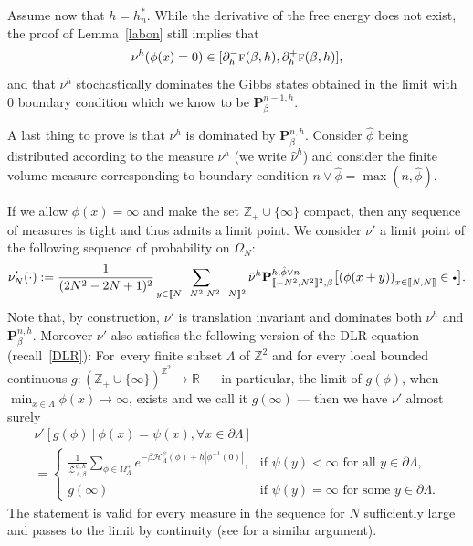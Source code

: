 \documentclass[JEP,XML,SOM,Unicode, NoFloatCountersInSection]{cedram}
\let\mathcal\mathscr
\newcommand{\sbullet}{{\scriptscriptstyle\bullet}}
\newcommand{\csbullet}{{\raisebox{1pt}{$\sbullet$}}}
\numberwithin{equation}{section}
\theoremstyle{plain}
\theoremstyle{definition}
\newcommand{\lint}{\llbracket}
\newcommand{\rint}{\rrbracket}
\newcommand{\cH}{{\ensuremath{\mathcal H}} }
\newcommand{\cZ}{{\ensuremath{\mathcal Z}} }
\newcommand{\bP}{{\ensuremath{\mathbf P}} }
\newcommand{\bbR}{{\ensuremath{\mathbb R}} }
\newcommand{\bbZ}{{\ensuremath{\mathbb Z}} }
\newcommand{\gb}{\beta}
\newcommand{\gO}{\Omega}
\newcommand{\gL}{\Lambda}
\newcommand{\tf}{\textsc{f}}
\begin{document}
Assume now that $h=h^*_n$.
While the derivative of the free energy does not exist, the proof of Lemma~\ref{labon} still implies that
\[
\nu^h(\phi(x)=0)\in [\partial^-_h \tf(\gb,h),\partial^+_h\tf(\gb,h)],
\]
and that $\nu^h$ stochastically
dominates the Gibbs states obtained in the limit with $0$ boundary condition which we know to be $\bP^{n-1,h}_\gb$.

A last thing to prove is that $\nu^h$ is dominated by $\bP^{n,h}_{\gb}$.
Consider $\hat \phi$ being distributed according to the measure $\nu^h$ (we write $\hat \nu^h$)
and consider the finite volume measure corresponding to boundary condition $n\vee\hat \phi=\max(n,\hat \phi)$.

If we allow $\phi(x)=\infty$ and make the set $\bbZ_+\cup\{\infty\}$ compact, then any sequence of measures is tight and thus admits a limit point.
We consider $\nu'$ a limit point of the following sequence of probability on $\gO_N$:
\begin{equation*}
\nu'_N(\cdot):=\frac{1}{(2N^2-2N+1)^2}\sum_{y\in \lint N-N^2,N^2-N\rint^2}\hat \nu^h \bP^{h,\hat \phi\vee n}_{\lint -N^2,N^2\rint^2,\gb}\bigl[ \left(\phi(x+y)\right)_{x\in \lint N,N\rint} \in \csbullet \bigr].
\end{equation*}
Note that, by construction, $\nu'$ is translation invariant and dominates both $\nu^h$ and $\bP^{n,h}_{\gb}$.
Moreover $\nu'$ also satisfies the following version of the DLR equation (recall~\eqref{DLR}):
For~every finite subset $\gL$ of $\bbZ^2$ and for every local bounded continuous \hbox{$g: (\bbZ_+\cup\{\infty\})^{\bbZ^2} \to \bbR$} --- in
particular, the limit of $g(\phi)$, when $\min_{x\in \gL}\phi(x)\to \infty$, exists and we call it $g(\infty)$ --- then we have $\nu'$ almost surely
\begin{multline*}%
\nu'\left[ g(\phi) \ | \ \phi(x)=\psi(x), \forall x\in \partial \gL\right]\\=
\begin{cases}
\frac{1}{\cZ^{\psi,h}_{\gL,\gb}}\sum_{\phi\in \gO^+_{\gL}}e^{-\beta\cH^{\psi}_{\gL}(\phi)+h|\phi^{-1}(0)|},
&\text{if } \psi(y)<\infty \text{ for all } y \in \partial \gL,\\
g(\infty) &\text{if } \psi(y)=\infty \text{ for some } y \in \partial \gL.
\end{cases}
\end{multline*}
The statement is valid for every measure in the sequence for $N$ sufficiently large and passes to the limit by continuity
(see \cite[Eq.\,(5.3)]{cf:GL} for a similar argument).
\end{document}
